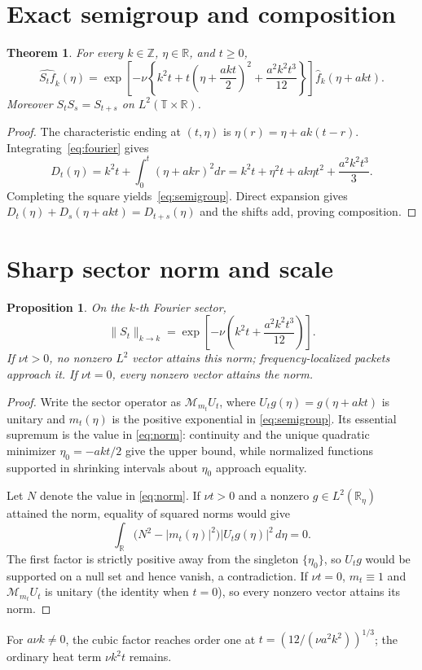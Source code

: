 \documentclass[9pt]{extarticle}
\newtheorem{theorem}{Theorem}
\newtheorem{proposition}{Proposition}
\newcommand{\R}{\mathbb R}
\newcommand{\T}{\mathbb T}
\begin{document}
\section{Exact semigroup and composition}
\begin{theorem}\label{thm:main}
For every $k\in\mathbb Z$, $\eta\in\R$, and $t\ge0$,
\begin{equation}\label{eq:semigroup}
 \widehat{S_tf}_k(\eta)=\exp\!\left[-\nu\left\{k^2t+
 t\left(\eta+\frac{akt}{2}\right)^2+\frac{a^2k^2t^3}{12}\right\}\right]
 \widehat f_k(\eta+akt).
\end{equation}
Moreover $S_tS_s=S_{t+s}$ on $L^2(\T\times\R)$.
\end{theorem}
\begin{proof}
The characteristic ending at $(t,\eta)$ is
$\eta(r)=\eta+ak(t-r)$.  Integrating~\eqref{eq:fourier} gives
\[
 D_t(\eta)=k^2t+\int_0^t(\eta+akr)^2dr
 =k^2t+\eta^2t+ak\eta t^2+\frac{a^2k^2t^3}{3}.
\]
Completing the square yields~\eqref{eq:semigroup}.  Direct expansion gives
$D_t(\eta)+D_s(\eta+akt)=D_{t+s}(\eta)$ and the shifts add, proving composition.
\end{proof}

\section{Sharp sector norm and scale}
\begin{proposition}\label{prop:norm}
On the $k$-th Fourier sector,
\begin{equation}\label{eq:norm}
 \|S_t\|_{k\to k}=
 \exp\!\left[-\nu\left(k^2t+\frac{a^2k^2t^3}{12}\right)\right].
\end{equation}
If $\nu t>0$, no nonzero $L^2$ vector attains this norm; frequency-localized
packets approach it.  If $\nu t=0$, every nonzero vector attains the norm.
\end{proposition}
\begin{proof}
Write the sector operator as $\mathcal M_{m_t}U_t$, where
$U_tg(\eta)=g(\eta+akt)$ is unitary and $m_t(\eta)$ is the positive
exponential in \eqref{eq:semigroup}.  Its essential supremum is the value in
\eqref{eq:norm}: continuity and the unique quadratic minimizer
$\eta_0=-akt/2$ give the upper bound, while normalized functions supported in
shrinking intervals about $\eta_0$ approach equality.

Let $N$ denote the value in \eqref{eq:norm}.  If $\nu t>0$ and a nonzero
$g\in L^2(\R_\eta)$ attained the norm, equality of squared norms would give
\[
 \int_\R\bigl(N^2-|m_t(\eta)|^2\bigr)|U_tg(\eta)|^2\,d\eta=0.
\]
The first factor is strictly positive away from the singleton $\{\eta_0\}$,
so $U_tg$ would be supported on a null set and hence vanish, a contradiction.
If $\nu t=0$, $m_t\equiv1$ and $\mathcal M_{m_t}U_t$ is unitary (the identity
when $t=0$), so every nonzero vector attains its norm.
\end{proof}
For $a\nu k\ne0$, the cubic factor reaches order one at
$t=(12/(\nu a^2k^2))^{1/3}$; the ordinary heat term $\nu k^2t$ remains.
\end{document}
